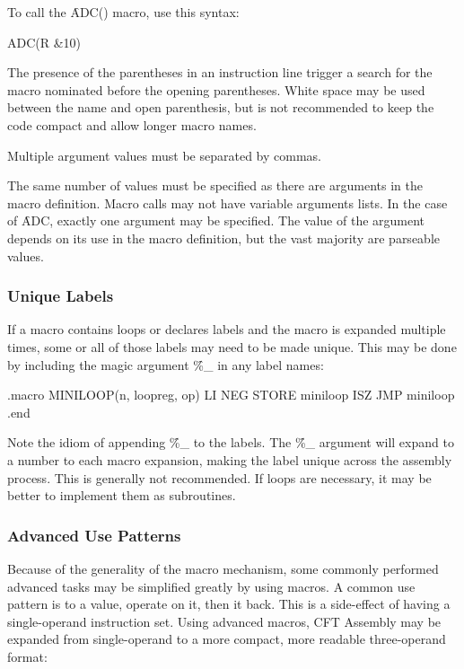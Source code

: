To call the \f{ADC()} macro, use this syntax:

\begin{cftasmcode}
ADC(R &10)
\end{cftasmcode}

The presence of the parentheses in an instruction line trigger a search for the
macro nominated before the opening parentheses. White space may be used between
the name and open parenthesis, but is not recommended to keep the code compact
and allow longer macro names.

Multiple argument values must be separated by commas.

The same number of values must be specified as there are arguments in the macro
definition. Macro calls may not have variable arguments lists. In the case of
\f{ADC}, exactly one argument may be specified. The value of the argument
depends on its use in the macro definition, but the vast majority are parseable
values.

\subsubsection{Unique Labels}

If a macro contains loops or declares labels and the macro is expanded multiple
times, some or all of those labels may need to be made unique. This may be done
by including the magic argument \f{\%\_} in any label names:

\begin{cftasmcode}
.macro MINILOOP(n, loopreg, op)
    LI %
    NEG
    STORE %
miniloop%
    ISZ %
    JMP miniloop%
.end
\end{cftasmcode}

Note the idiom of appending \f{\%\_} to the labels. The \f{\%\_} argument will
expand to a number to each macro expansion, making the label unique across the
assembly process. This is generally not recommended. If loops are necessary, it
may be better to implement them as subroutines.


\subsubsection{Advanced Use Patterns}

Because of the generality of the macro mechanism, some commonly performed
advanced tasks may be simplified greatly by using macros. A common use pattern
is to  a value, operate on it, then  it back. This is a
side-effect of having a single-operand instruction set. Using advanced macros,
CFT Assembly may be expanded from single-operand to a more compact, more
readable three-operand format:


